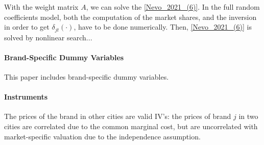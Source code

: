 \documentclass[11pt]{elegantbook}
\begin{document}
With the weight matrix $A$, we can solve the \eqref{Nevo_2021_(6)}. In the full random coefficients model, both the computation of the market shares, and the inversion in order to get $\delta_{jt}(\cdot)$, have to be done numerically. Then, \eqref{Nevo_2021_(6)} is solved by nonlinear search...

\paragraph*{Brand-Specific Dummy Variables} This paper includes brand-specific dummy variables.

\paragraph*{Instruments}
The prices of the brand in other cities are valid IV's: the prices of brand $j$ in two cities are correlated due to the common marginal cost, but are uncorrelated with market-specific valuation due to the independence assumption.
























\end{document}
